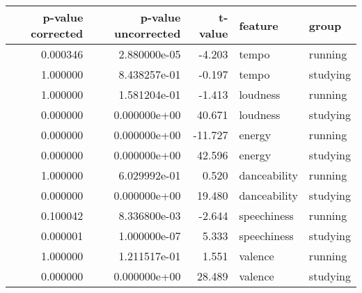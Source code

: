 \begin{tabular}{rrrll}
\toprule
 p-value corrected &  p-value uncorrected &  t-value &       feature &     group \\
\midrule
          0.000346 &         2.880000e-05 &   -4.203 &         tempo &   running \\
          1.000000 &         8.438257e-01 &   -0.197 &         tempo &  studying \\
          1.000000 &         1.581204e-01 &   -1.413 &      loudness &   running \\
          0.000000 &         0.000000e+00 &   40.671 &      loudness &  studying \\
          0.000000 &         0.000000e+00 &  -11.727 &        energy &   running \\
          0.000000 &         0.000000e+00 &   42.596 &        energy &  studying \\
          1.000000 &         6.029992e-01 &    0.520 &  danceability &   running \\
          0.000000 &         0.000000e+00 &   19.480 &  danceability &  studying \\
          0.100042 &         8.336800e-03 &   -2.644 &   speechiness &   running \\
          0.000001 &         1.000000e-07 &    5.333 &   speechiness &  studying \\
          1.000000 &         1.211517e-01 &    1.551 &       valence &   running \\
          0.000000 &         0.000000e+00 &   28.489 &       valence &  studying \\
\bottomrule
\end{tabular}
